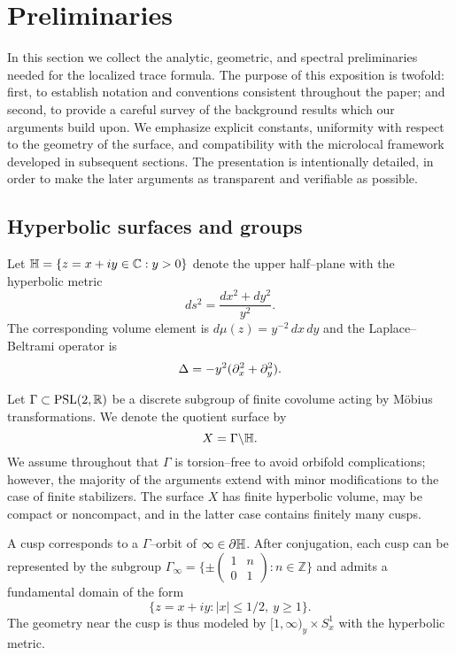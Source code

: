 \section{Preliminaries}\label{sec:prelim}

In this section we collect the analytic, geometric, and spectral preliminaries needed for the localized trace formula. The purpose of this exposition is twofold: first, to establish notation and conventions consistent throughout the paper; and second, to provide a careful survey of the background results which our arguments build upon. We emphasize explicit constants, uniformity with respect to the geometry of the surface, and compatibility with the microlocal framework developed in subsequent sections. The presentation is intentionally detailed, in order to make the later arguments as transparent and verifiable as possible.

\subsection{Hyperbolic surfaces and groups}\label{subsec:surfaces}

Let $\mathbb{H} = \{ z = x + iy \in \mathbb{C} : y > 0\}$ denote the upper half–plane with the hyperbolic metric
\[
ds^2 = \frac{dx^2 + dy^2}{y^2}.
\]
The corresponding volume element is $d\mu(z) = y^{-2}\,dx\,dy$ and the Laplace–Beltrami operator is
\[
\Delta = -y^2(\partial_x^2 + \partial_y^2).
\]

Let $\Gamma \subset \mathrm{PSL}(2,\mathbb{R})$ be a discrete subgroup of finite covolume acting by Möbius transformations. We denote the quotient surface by
\[
X = \Gamma \backslash \mathbb{H}.
\]
We assume throughout that $\Gamma$ is torsion–free to avoid orbifold complications; however, the majority of the arguments extend with minor modifications to the case of finite stabilizers. The surface $X$ has finite hyperbolic volume, may be compact or noncompact, and in the latter case contains finitely many cusps.

A cusp corresponds to a $\Gamma$–orbit of $\infty \in \partial \mathbb{H}$. After conjugation, each cusp can be represented by the subgroup $\Gamma_\infty = \{ \pm \begin{pmatrix} 1 & n \\ 0 & 1 \end{pmatrix} : n \in \mathbb{Z}\}$ and admits a fundamental domain of the form
\[
\{ z = x+iy : |x| \leq 1/2, \ y \geq 1\}.
\]
The geometry near the cusp is thus modeled by $[1,\infty)_y \times S^1_x$ with the hyperbolic metric.

